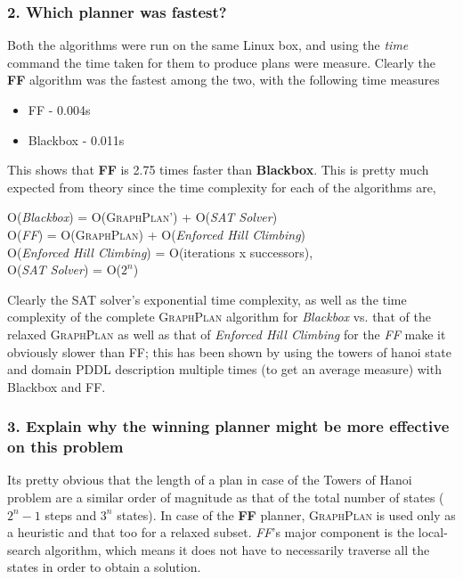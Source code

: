 \documentclass[10pt, letter]{article}
\begin{document}
\subsubsection*{2. Which planner was fastest?}
\label{subsubsec_2}
Both the algorithms were run on the same Linux box, and using the \textit{time} command the time taken for them to produce plans were measure. Clearly the \textbf{FF} algorithm was the fastest among the two, with the following time measures \\
\begin{itemize}
\item FF - 0.004s
\item Blackbox - 0.011s
\end{itemize}
This shows that \textbf{FF} is 2.75 times faster than \textbf{Blackbox}. This is pretty much expected from theory since the time complexity for each of the algorithms are,
\begin{center}
	O(\textit{Blackbox}) = O(\textsc{GraphPlan'}) + O(\textit{SAT Solver})\\
	O(\textit{FF}) = O(\textsc{GraphPlan}) + O(\textit{Enforced Hill Climbing})\\
	O(\textit{Enforced Hill Climbing}) = O(iterations x successors),\\
	O(\textit{SAT Solver}) = O($2^n$)
\end{center}
Clearly the SAT solver's exponential time complexity, as well as the time complexity of the complete \textsc{GraphPlan} algorithm for \textit{Blackbox} vs. that of the relaxed \textsc{GraphPlan} as well as that of \textit{Enforced Hill Climbing} for the \textit{FF} make it obviously slower than FF; this has been shown by using the towers of hanoi state and domain PDDL description multiple times (to get an average measure) with Blackbox and FF.
\subsubsection*{3. Explain why the winning planner might be more effective on this problem}
Its pretty obvious that the length of a plan in case of the Towers of Hanoi problem are a similar order of magnitude as that of the total number of states ($2^n - 1$ steps and $3^n$ states). In case of the \textbf{FF} planner, \textsc{GraphPlan} is used only as a heuristic and that too for a relaxed subset. \textit{FF}'s major component is the local-search algorithm, which means it does not have to necessarily traverse all the states in order to obtain a solution.
\end{document}
